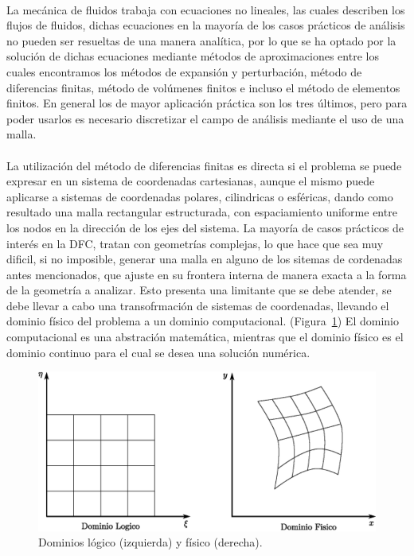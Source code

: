 \documentclass[letterpaper, openright, 12pt]{book}
\begin{document}
    \paragraph*{}
    La mecánica de fluidos trabaja con ecuaciones no lineales, las cuales
    describen los flujos de fluidos, dichas ecuaciones en la mayoría de los
    casos prácticos de análisis no pueden ser resueltas de una manera analítica,
    por lo que se ha optado por la solución de dichas ecuaciones mediante
    métodos de aproximaciones entre los cuales encontramos los métodos de
    expansión y perturbación, método de diferencias finitas, método de volúmenes
    finitos e incluso el método de elementos finitos. En general los de mayor
    aplicación práctica son los tres últimos, pero para poder usarlos es
    necesario discretizar el campo de análisis mediante el uso de una malla.\cite{thompsonhandbook}
    \paragraph*{}
    La utilización del método de diferencias finitas es directa si el problema
    se puede expresar en un sistema de coordenadas cartesianas, aunque el mismo
    puede aplicarse a sistemas de coordenadas polares, cilindricas o esféricas,
    dando como resultado una malla rectangular estructurada, con espaciamiento
    uniforme entre los nodos en la dirección de los ejes del sistema. La mayoría
    de casos prácticos de interés en la DFC, tratan con geometrías complejas,
    lo que hace que sea muy dificil, si no imposible, generar una malla en
    alguno de los sitemas de cordenadas antes mencionados, que ajuste en su
    frontera interna de manera exacta a la forma de la geometría a analizar.
    Esto presenta una limitante que se debe atender, se debe llevar a cabo una
    transofrmación de sistemas de coordenadas, llevando el dominio físico del
    problema a un dominio computacional. (Figura~\ref{fig:dominios}) El dominio
    computacional es una abstración matemática, mientras que el dominio físico
    es el dominio continuo para el cual se desea una solución numérica.
    \begin{figure}[htbp!]
        \centering
        \includegraphics[keepaspectratio, width=170mm]{./Imagenes/dominios}
        \caption[Dominios lógico y físico]{Dominios lógico (izquierda) y físico (derecha). \cite{numerical-grid}}
        \label{fig:dominios}
    \end{figure}
\end{document}
